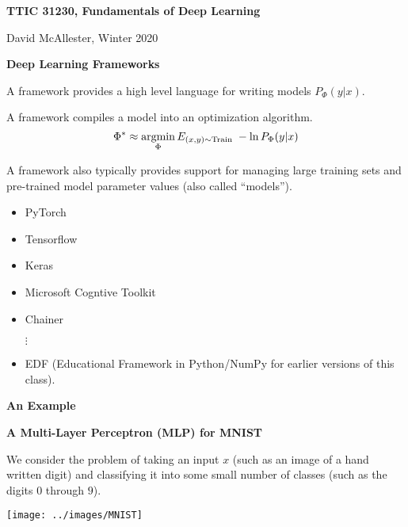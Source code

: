 




{\Huge
  
  \centerline{\bf TTIC 31230, Fundamentals of Deep Learning}
  \bigskip
  \centerline{David McAllester, Winter 2020}
  \vfill
  \vfill
  \centerline{\bf Deep Learning Frameworks}
  \vfill
  \vfill


A framework provides a high level language for writing models $P_\Phi(y|x)$.

\vfill
A framework compiles a model into an optimization algorithm.
\vfill
{\color{red} $$\Phi^* \approx \operatorname*{argmin}_\Phi E_{(x,y) \sim \mathrm{Train}} \; -\ln P_\Phi(y|x)$$}

\vfill
A framework also typically provides support for managing large training sets and pre-trained model parameter values (also called ``models'').


\begin{itemize}

\item PyTorch

\vfill
\item Tensorflow

\vfill
\item Keras

\vfill
\item Microsoft Cogntive Toolkit

\vfill
\item Chainer

$\vdots$

\item EDF (Educational Framework in Python/NumPy for earlier versions of this class).
\end{itemize}



\slide{}

\centerline{\bf An Example}

\vfill
\centerline{\bf A Multi-Layer Perceptron (MLP) for MNIST}

\slide{}

We consider the problem of taking an input $x$ (such as an image of a hand written digit) and classifying it into some small number of classes (such as the digits $0$ through $9$).

\vfill
\centerline{\texttt{[image: ../images/MNIST]}}
  
}
